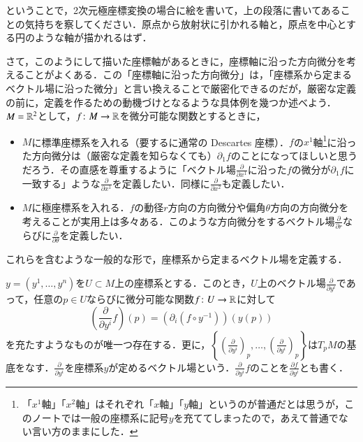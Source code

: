 \begin{que}
ということで，2次元極座標変換の場合に絵を書いて，上の段落に書いてあることの気持ちを察してください．原点から放射状に引かれる軸と，原点を中心とする円のような軸が描かれるはず．
\end{que}

さて，このようにして描いた座標軸があるときに，座標軸に沿った方向微分を考えることがよくある．この「座標軸に沿った方向微分」は，「座標系から定まるベクトル場に沿った微分」と言い換えることで厳密化できるのだが，厳密な定義の前に，定義を作るための動機づけとなるような具体例を幾つか述べよう．$M=\mathbb{R}^2$として，$f \colon M \to \mathbb{R}$を微分可能な関数とするときに，
\begin{itemize}
\item $M$に標準座標系を入れる（要するに通常の Descartes 座標）．$f$の$x^1$軸\footnote{「$x^1$軸」「$x^2$軸」はそれぞれ「$x$軸」「$y$軸」というのが普通だとは思うが，このノートでは一般の座標系に記号$y$を充ててしまったので，あえて普通でない言い方のままにした．}に沿った方向微分は（厳密な定義を知らなくても）$\partial_1 f$のことになってほしいと思うだろう．その直感を尊重するように「ベクトル場$\frac{\partial}{\partial x^1}$に沿った$f$の微分が$\partial_1 f$に一致する」ような$\frac{\partial}{\partial x^1}$を定義したい．同様に$\frac{\partial}{\partial x^2}$も定義したい．
\item $M$に極座標系を入れる．$f$の動径$r$方向の方向微分や偏角$\theta$方向の方向微分を考えることが実用上は多々ある．このような方向微分をするベクトル場$\frac{\partial}{\partial r}$ならびに$\frac{\partial}{\partial \theta}$を定義したい．
\end{itemize}

これらを含むような一般的な形で，座標系から定まるベクトル場を定義する．
\begin{prop}
$y=(y^1, \dots, y^n)$を$U \subset M$上の座標系とする．このとき，$U$上のベクトル場$\frac{\partial}{\partial y^i}$であって，任意の$p \in U$ならびに微分可能な関数$f \colon U \to \mathbb{R}$に対して
\begin{equation}
\left( \frac{\partial}{\partial y^i} f \right)(p) = \left(\partial_i (f \circ y^{-1}) \right) (y(p))
\end{equation}を充たすようなものが唯一つ存在する．更に，$\left\{ \left(\frac{\partial}{\partial y^i}\right)_p,\dots, \left(\frac{\partial}{\partial y^i}\right)_p \right\}$は$T_pM$の基底をなす．$\frac{\partial}{\partial y^i}$を座標系$y$が定めるベクトル場という．$\frac{\partial}{\partial y^i} f$のことを$\frac{\partial f}{\partial y^i}$とも書く．
\end{prop}

